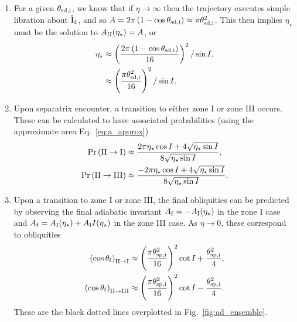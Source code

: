 \documentclass[
        fleqn,
        usenatbib,
    ]{mnras}
\newcommand*{\bm}[1]{\boldsymbol{\mathbf{#1}}}
\newcommand*{\uv}[1]{\hat{\bm{#1}}}
\newcommand*{\p}[1]{\left(#1\right)}
\begin{document}
\begin{enumerate}
    \item For a given $\theta_{\rm sd, i}$, we know that if $\eta \to \infty$
        then the trajectory executes simple libration about $\uv{l}_{\rm d}$,
        and so $A = 2\pi\p{1 - \cos \theta_{\rm sd, i}} \approx \pi \theta_{\rm
        sd, i}^2$. This then implies $\eta_\star$ must be the solution to
        $A_{\rm II}(\eta_\star) = A$, or
        \begin{align}
            \eta_\star &\approx \p{\frac{2\pi\p{1 - \cos \theta_{\rm sd,i}}}{
                        16}}^2 / \sin I,\\
                    &\approx \p{\frac{\pi \theta_{\rm sd, i}^2}{16}}^2/\sin I.
        \end{align}

    \item Upon separatrix encounter, a transition to either zone I or zone
        III occurs. These can be calculated to have associated probabilities
        (using the approximate area Eq.~\eqref{eq:a_approx})
        \begin{subequations}
            \begin{align}
                \Pr\p{\rm II \to I} &\approx \frac{2\pi
                    \eta_{\star} \cos I + 4\sqrt{\eta_{\star}\sin
                    I}}{8\sqrt{\eta_{\star}\sin I}},\\
                \Pr\p{\rm II \to III} &\approx \frac{-2\pi
                    \eta_{\star} \cos I + 4\sqrt{\eta_{\star}\sin
                    I}}{8\sqrt{\eta_{\star}\sin I}}.
            \end{align}
        \end{subequations}

    \item Upon a transition to zone I or zone III, the final obliquities can
        be predicted by observing the final adiabatic invariant $A_{\rm f} = -A_{\rm
        I}(\eta_\star)$ in the zone I case and $A_{\rm f} = A_{\rm I}(\eta_\star) +
        A_{\rm I}I(\eta_\star)$ in the zone III case. As $\eta \to 0$, these
        correspond to obliquities
        \begin{subequations}\label{se:q_f_approx}
            \begin{align}
                \p{\cos \theta_{\rm f}}_{\rm II \to I} &\approx
                    \p{\frac{\pi \theta_{\rm sp, i}^2}{16}}^2 \cot I
                        + \frac{\theta_{\rm sp, i}^2}{4},\\
                \p{\cos \theta_{\rm f}}_{\rm II \to III} &\approx
                    \p{\frac{\pi \theta_{\rm sp, i}^2}{16}}^2 \cot I
                        - \frac{\theta_{\rm sp, i}^2}{4}.
            \end{align}
        \end{subequations}
        These are the black dotted lines overplotted in
        Fig.~\ref{fig:ad_ensemble}.
\end{enumerate}


\bsp
\label{lastpage} %
\end{document}
